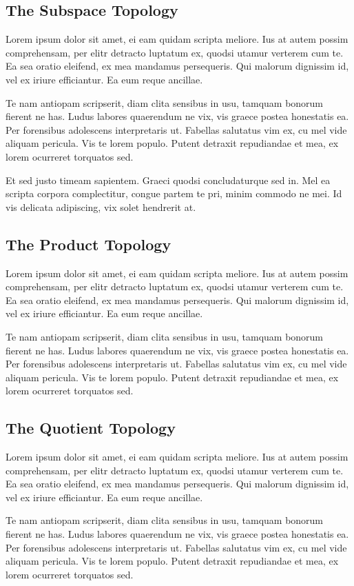 \documentclass[12pt, a4paper]{article}
\theoremstyle{definition}
\theoremstyle{remark}
\numberwithin{equation}{section}
\numberwithin{figure}{section}
\numberwithin{table}{section}
\begin{document}
        \subsection{The Subspace Topology}
            Lorem ipsum dolor sit amet, ei eam quidam scripta meliore. Ius at autem possim comprehensam, per elitr detracto luptatum ex, quodsi utamur verterem cum te. Ea sea oratio eleifend, ex mea mandamus persequeris. Qui malorum dignissim id, vel ex iriure efficiantur. Ea eum reque ancillae.

            Te nam antiopam scripserit, diam clita sensibus in usu, tamquam bonorum fierent ne has. Ludus labores quaerendum ne vix, vis graece postea honestatis ea. Per forensibus adolescens interpretaris ut. Fabellas salutatus vim ex, cu mel vide aliquam pericula. Vis te lorem populo. Putent detraxit repudiandae et mea, ex lorem ocurreret torquatos sed.

            Et sed justo timeam sapientem. Graeci quodsi concludaturque sed in. Mel ea scripta corpora complectitur, congue partem te pri, minim commodo ne mei. Id vis delicata adipiscing, vix solet hendrerit at.
        \subsection{The Product Topology}
            Lorem ipsum dolor sit amet, ei eam quidam scripta meliore. Ius at autem possim comprehensam, per elitr detracto luptatum ex, quodsi utamur verterem cum te. Ea sea oratio eleifend, ex mea mandamus persequeris. Qui malorum dignissim id, vel ex iriure efficiantur. Ea eum reque ancillae.

            Te nam antiopam scripserit, diam clita sensibus in usu, tamquam bonorum fierent ne has. Ludus labores quaerendum ne vix, vis graece postea honestatis ea. Per forensibus adolescens interpretaris ut. Fabellas salutatus vim ex, cu mel vide aliquam pericula. Vis te lorem populo. Putent detraxit repudiandae et mea, ex lorem ocurreret torquatos sed.
        \subsection{The Quotient Topology}
            Lorem ipsum dolor sit amet, ei eam quidam scripta meliore. Ius at autem possim comprehensam, per elitr detracto luptatum ex, quodsi utamur verterem cum te. Ea sea oratio eleifend, ex mea mandamus persequeris. Qui malorum dignissim id, vel ex iriure efficiantur. Ea eum reque ancillae.

            Te nam antiopam scripserit, diam clita sensibus in usu, tamquam bonorum fierent ne has. Ludus labores quaerendum ne vix, vis graece postea honestatis ea. Per forensibus adolescens interpretaris ut. Fabellas salutatus vim ex, cu mel vide aliquam pericula. Vis te lorem populo. Putent detraxit repudiandae et mea, ex lorem ocurreret torquatos sed.
\end{document}
